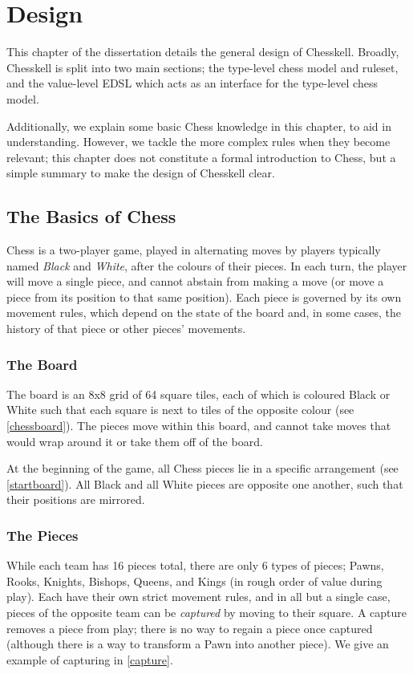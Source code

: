 \documentclass[12pt, a4paper, bibliography=totocnumbered]{scrreprt}
\begin{document}
\chapter{Design}

This chapter of the dissertation details the general design of Chesskell. Broadly, Chesskell is split into two main sections; the type-level chess model and ruleset, and the value-level EDSL which acts as an interface for the type-level chess model.

Additionally, we explain some basic Chess knowledge in this chapter, to aid in understanding. However, we tackle the more complex rules when they become relevant; this chapter does not constitute a formal introduction to Chess, but a simple summary to make the design of Chesskell clear.

\section{The Basics of Chess}

Chess is a two-player game, played in alternating moves by players typically named \emph{Black} and \emph{White}, after the colours of their pieces. In each turn, the player will move a single piece, and cannot abstain from making a move (or move a piece from its position to that same position). Each piece is governed by its own movement rules, which depend on the state of the board and, in some cases, the history of that piece or other pieces' movements.

\subsection{The Board}

The board is an 8x8 grid of 64 square tiles, each of which is coloured Black or White such that each square is next to tiles of the opposite colour (see \cref{chessboard}). The pieces move within this board, and cannot take moves that would wrap around it or take them off of the board.

At the beginning of the game, all Chess pieces lie in a specific arrangement (see \cref{startboard}). All Black and all White pieces are opposite one another, such that their positions are mirrored.

\subsection{The Pieces}

While each team has 16 pieces total, there are only 6 types of pieces; Pawns, Rooks, Knights, Bishops, Queens, and Kings (in rough order of value during play). Each have their own strict movement rules, and in all but a single case, pieces of the opposite team can be \emph{captured} by moving to their square. A capture removes a piece from play; there is no way to regain a piece once captured (although there is a way to transform a Pawn into another piece). We give an example of capturing in \cref{capture}.
\end{document}

